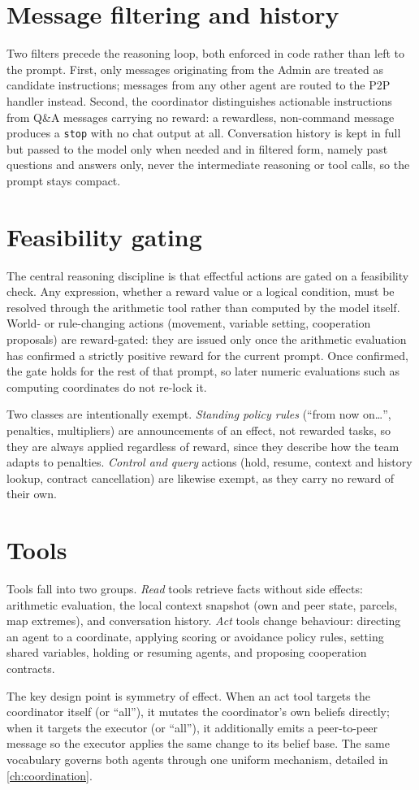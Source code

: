 \section{Message filtering and history}
\label{sec:filtering-history}
Two filters precede the reasoning loop, both enforced in code rather than left to the
prompt. First, only messages originating from the Admin are treated as candidate
instructions; messages from any other agent are routed to the P2P handler instead.
Second, the coordinator distinguishes actionable instructions from Q\&A messages
carrying no reward: a rewardless, non-command message produces a \texttt{stop} with
no chat output at all. Conversation history is kept in full but passed to the model
only when needed and in filtered form, namely past questions and answers only, never
the intermediate reasoning or tool calls, so the prompt stays compact.

\section{Feasibility gating}
\label{sec:feasibility}
The central reasoning discipline is that effectful actions are gated on a feasibility
check. Any expression, whether a reward value or a logical condition, must be resolved
through the arithmetic tool rather than computed by the model itself. World- or
rule-changing actions (movement, variable setting, cooperation proposals) are
reward-gated: they are issued only once the arithmetic evaluation has confirmed a
strictly positive reward for the current prompt. Once confirmed, the gate holds
for the rest of that prompt, so later numeric evaluations such as computing
coordinates do not re-lock it.

Two classes are intentionally exempt. \emph{Standing policy rules}
(``from now on\ldots'', penalties, multipliers) are announcements of an effect, not
rewarded tasks, so they are always applied regardless of reward, since they describe
how the team adapts to penalties. \emph{Control and query} actions (hold, resume,
context and history lookup, contract cancellation) are likewise exempt, as they carry
no reward of their own.

\section{Tools}
\label{sec:tools}
Tools fall into two groups. \emph{Read} tools retrieve facts without side effects:
arithmetic evaluation, the local context snapshot (own and peer state, parcels, map
extremes), and conversation history. \emph{Act} tools change behaviour: directing an
agent to a coordinate, applying scoring or avoidance policy rules, setting shared
variables, holding or resuming agents, and proposing cooperation contracts.

The key design point is symmetry of effect. When an act tool targets the coordinator
itself (or ``all''), it mutates the coordinator's own beliefs directly; when it
targets the executor (or ``all''), it additionally emits a peer-to-peer message so
the executor applies the same change to its belief base. The same vocabulary governs
both agents through one uniform mechanism, detailed in \cref{ch:coordination}.
